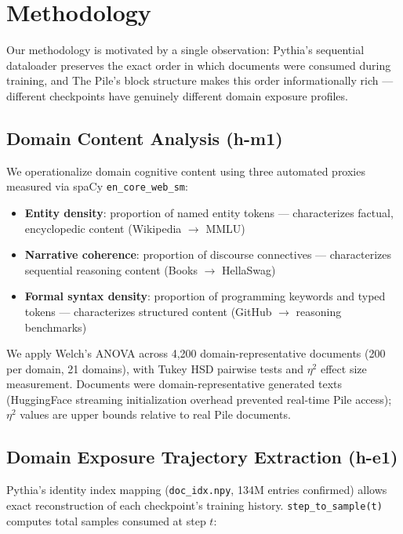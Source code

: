 \section{Methodology}

Our methodology is motivated by a single observation: Pythia's sequential dataloader preserves the exact order in which documents were consumed during training, and The Pile's block structure makes this order informationally rich --- different checkpoints have genuinely different domain exposure profiles.

\subsection{Domain Content Analysis (h-m1)}

We operationalize domain cognitive content using three automated proxies measured via spaCy \texttt{en\_core\_web\_sm}:

\begin{itemize}
  \item \textbf{Entity density}: proportion of named entity tokens --- characterizes factual, encyclopedic content (Wikipedia $\to$ MMLU)
  \item \textbf{Narrative coherence}: proportion of discourse connectives --- characterizes sequential reasoning content (Books $\to$ HellaSwag)
  \item \textbf{Formal syntax density}: proportion of programming keywords and typed tokens --- characterizes structured content (GitHub $\to$ reasoning benchmarks)
\end{itemize}

We apply Welch's ANOVA across 4,200 domain-representative documents (200 per domain, 21 domains), with Tukey HSD pairwise tests and $\eta^2$ effect size measurement. Documents were domain-representative generated texts (HuggingFace streaming initialization overhead prevented real-time Pile access); $\eta^2$ values are upper bounds relative to real Pile documents.

\subsection{Domain Exposure Trajectory Extraction (h-e1)}

Pythia's identity index mapping (\texttt{doc\_idx.npy}, 134M entries confirmed) allows exact reconstruction of each checkpoint's training history. \texttt{step\_to\_sample(t)} computes total samples consumed at step $t$:


